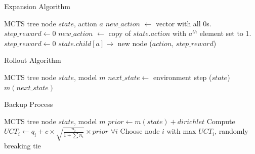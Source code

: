 \documentclass[%
 reprint,
 amsmath,amssymb,
 aps,
]{revtex4-2}
\begin{document}
\begin{algorithm}[H]
    \caption{Expansion Algorithm}
    \begin{algorithmic}
         MCTS tree node $state$, action $a$
        \STATE $new\_action$ $\leftarrow$ vector with all 0s.
        \STATE $step\_reward \leftarrow 0$
        \ELSE
        \STATE $new\_action$ $\leftarrow$ copy of $state.action$ with $a^{th}$ element set to 1.
        \STATE $step\_reward \leftarrow 0$
        \ENDIF
        \STATE $state.child[a] \rightarrow$ new node ($action$, $step\_reward$)
    \end{algorithmic}
\end{algorithm}

\begin{algorithm}[H]
    \caption{Rollout Algorithm}
    \begin{algorithmic}
         MCTS tree node $state$, model $m$
        \STATE $next\_state \leftarrow$ environment step ($state$)
        \RETURN $m(next\_state)$
    \end{algorithmic}
\end{algorithm}

\begin{algorithm}[H]
    \caption{Backup Process}
    \begin{algorithmic}
         MCTS tree node $state$, model $m$
        \STATE $prior \leftarrow m(state) + dirichlet$
        \STATE Compute $UCT_i \leftarrow q_i + c \times \sqrt{\frac{n_i}{1 + \sum n_i}} \times prior$ $\forall i$
        \STATE Choose node $i$ with max $UCT_i$, randomly breaking tie
    \end{algorithmic}
\end{algorithm}

\nocite{*}

\end{document}
